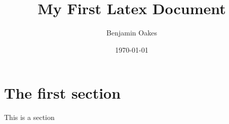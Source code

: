\documentclass{book}
\title{My First Latex Document}
\author{Benjamin Oakes}
\date{\today}
\begin{document}
    \maketitle
    \section{The first section}
    This is a section
\end{document}
